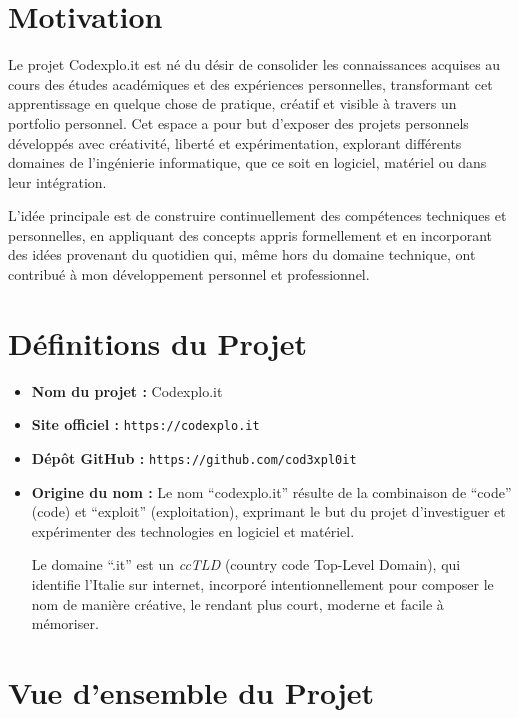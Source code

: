 \documentclass[10pt, a4paper, oneside]{article}
\begin{document}
\section{Motivation}

Le projet Codexplo.it est né du désir de consolider les connaissances acquises au cours des études académiques et des expériences personnelles, transformant cet apprentissage en quelque chose de pratique, créatif et visible à travers un portfolio personnel. Cet espace a pour but d’exposer des projets personnels développés avec créativité, liberté et expérimentation, explorant différents domaines de l’ingénierie informatique, que ce soit en logiciel, matériel ou dans leur intégration.\newline

L’idée principale est de construire continuellement des compétences techniques et personnelles, en appliquant des concepts appris formellement et en incorporant des idées provenant du quotidien qui, même hors du domaine technique, ont contribué à mon développement personnel et professionnel.\newpage

\section{Définitions du Projet}

\begin{itemize}
  \item \textbf{Nom du projet :} Codexplo.it  
  \item \textbf{Site officiel :} \texttt{https://codexplo.it}  
  \item \textbf{Dépôt GitHub :} \texttt{https://github.com/cod3xpl0it}  
  \item \textbf{Origine du nom :}  
  Le nom “codexplo.it” résulte de la combinaison de “code” (code) et “exploit” (exploitation), exprimant le but du projet d’investiguer et expérimenter des technologies en logiciel et matériel.\newline
  
  Le domaine “.it” est un \textit{ccTLD} (country code Top-Level Domain), qui identifie l’Italie sur internet, incorporé intentionnellement pour composer le nom de manière créative, le rendant plus court, moderne et facile à mémoriser.  
\end{itemize}

\section{Vue d’ensemble du Projet}
\end{document}
